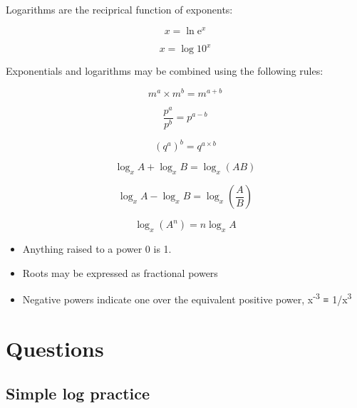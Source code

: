\documentclass[
]{book}
\providecommand{\tightlist}{%
  \setlength{\itemsep}{0pt}\setlength{\parskip}{0pt}}
\begin{document}
Logarithms are the reciprical function of exponents:

\begin{equation*}
x = \ln \textrm{e}^x
\end{equation*}

\begin{equation*}
x = \log 10^x
\end{equation*}

Exponentials and logarithms may be combined using the following rules:

\begin{equation}
m^a \times m^b = m^{a+b}
\label{eq:combpowermult}
\end{equation}

\begin{equation}
\frac{p^a}{p^b} = p^{a - b}
\label{eq:combpowerdiv}
\end{equation}

\begin{equation}
\left(q^a\right)^b =  q^{a\times b}
\label{eq:combpowerraise}
\end{equation}

\begin{equation}
\log_x A + \log_x B = \log_x (AB)
\label{eq:logadd}
\end{equation}

\begin{equation}
\log_x A  - \log_x B = \log_x \left(\frac{A}{B}\right)
\label{eq:logsub}
\end{equation}

\begin{equation}
\log_x (A^n)= n \log_x A
\label{eq:logpower}
\end{equation}

\begin{itemize}
\tightlist
\item
  Anything raised to a power 0 is 1.
\item
  Roots may be expressed as fractional powers
\item
  Negative powers indicate one over the equivalent positive power, x\textsuperscript{-3} ≡ 1/x\textsuperscript{3}
\end{itemize}

\hypertarget{sec:Questions2}{%
\section{Questions}\label{sec:Questions2}}

\hypertarget{sec:logpractice}{%
\subsection{Simple log practice}\label{sec:logpractice}}
\end{document}
